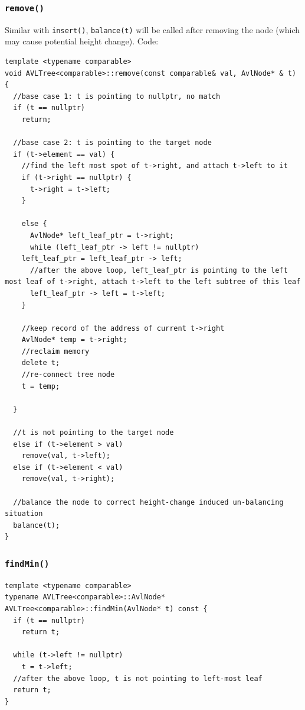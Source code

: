 \documentclass[12pt]{book}
\begin{document}
\subsubsection{\texttt{remove()}}
\label{sec:org126dca5}
Similar with \texttt{insert()}, \texttt{balance(t)} will be called after removing the node (which may cause potential height change). Code:
\begin{verbatim}
template <typename comparable>
void AVLTree<comparable>::remove(const comparable& val, AvlNode* & t) {
  //base case 1: t is pointing to nullptr, no match
  if (t == nullptr)
    return;

  //base case 2: t is pointing to the target node
  if (t->element == val) {
    //find the left most spot of t->right, and attach t->left to it
    if (t->right == nullptr) {
      t->right = t->left;
    }

    else {
      AvlNode* left_leaf_ptr = t->right;
      while (left_leaf_ptr -> left != nullptr)
	left_leaf_ptr = left_leaf_ptr -> left;
      //after the above loop, left_leaf_ptr is pointing to the left most leaf of t->right, attach t->left to the left subtree of this leaf
      left_leaf_ptr -> left = t->left;
    }

    //keep record of the address of current t->right
    AvlNode* temp = t->right;
    //reclaim memory 
    delete t;
    //re-connect tree node 
    t = temp;

  }

  //t is not pointing to the target node
  else if (t->element > val) 
    remove(val, t->left);
  else if (t->element < val)
    remove(val, t->right);

  //balance the node to correct height-change induced un-balancing situation
  balance(t);  
}
\end{verbatim}
\subsubsection{\texttt{findMin()}}
\label{sec:orgc9b41af}
\begin{verbatim}
template <typename comparable>
typename AVLTree<comparable>::AvlNode* AVLTree<comparable>::findMin(AvlNode* t) const {
  if (t == nullptr)
    return t;

  while (t->left != nullptr)
    t = t->left;
  //after the above loop, t is not pointing to left-most leaf
  return t;  
}
\end{verbatim}
\end{document}
